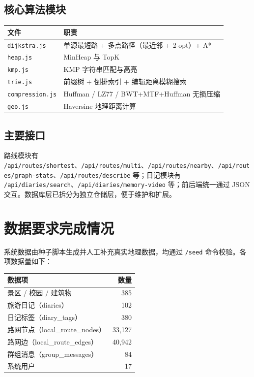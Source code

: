 \documentclass[UTF8,a4paper,12pt]{ctexart}
\begin{document}
\subsection{核心算法模块}
\begin{longtable}{ll}
\toprule
\textbf{文件} & \textbf{职责} \\
\midrule
\endhead
\texttt{dijkstra.js} & 单源最短路 + 多点路径（最近邻 + 2-opt）+ A* \\
\texttt{heap.js} & MinHeap 与 TopK \\
\texttt{kmp.js} & KMP 字符串匹配与高亮 \\
\texttt{trie.js} & 前缀树 + 倒排索引 + 编辑距离模糊搜索 \\
\texttt{compression.js} & Huffman / LZ77 / BWT+MTF+Huffman 无损压缩 \\
\texttt{geo.js} & Haversine 地理距离计算 \\
\bottomrule
\end{longtable}

\subsection{主要接口}
路线模块有 \texttt{/api/routes/shortest}、\texttt{/api/routes/multi}、\texttt{/api/routes/nearby}、\texttt{/api/routes/graph-stats}、\texttt{/api/routes/describe} 等；日记模块有 \texttt{/api/diaries/search}、\texttt{/api/diaries/memory-video} 等；前后端统一通过 JSON 交互。数据库层已拆分为独立仓储层，便于维护和扩展。

\section{数据要求完成情况}

系统数据由种子脚本生成并人工补充真实地理数据，均通过 \texttt{/seed} 命令校验。各项数据量如下：

\begin{longtable}{lr}
\toprule
\textbf{数据项} & \textbf{数量} \\
\midrule
\endhead
景区 / 校园 / 建筑物 & 385 \\
旅游日记（diaries） & 102 \\
日记标签（diary\_tags） & 380 \\
路网节点（local\_route\_nodes） & 33,127 \\
路网边（local\_route\_edges） & 40,942 \\
群组消息（group\_messages） & 84 \\
系统用户 & 17 \\
\bottomrule
\end{longtable}
\end{document}
